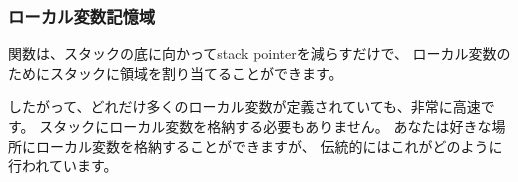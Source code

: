\subsubsection{ローカル変数記憶域}

関数は、スタックの底に向かって\gls{stack pointer}を減らすだけで、
ローカル変数のためにスタックに領域を割り当てることができます。


したがって、どれだけ多くのローカル変数が定義されていても、非常に高速です。 
スタックにローカル変数を格納する必要もありません。 
あなたは好きな場所にローカル変数を格納することができますが、
伝統的にはこれがどのように行われています。
